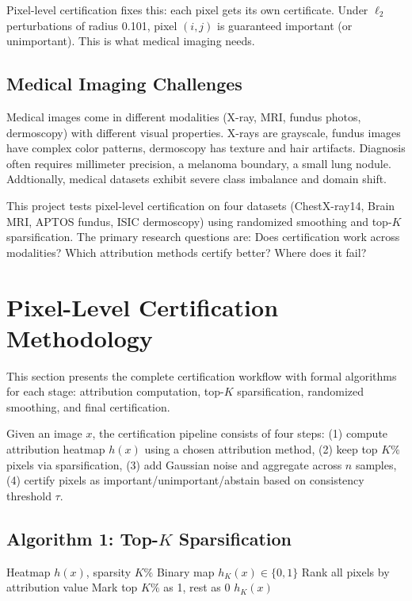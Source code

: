 \documentclass[11pt]{article}
\begin{document}
Pixel-level certification fixes this: each pixel gets its own certificate. Under $\ell_2$ perturbations of radius 0.101, pixel $(i,j)$ is guaranteed important (or unimportant). This is what medical imaging needs.

\subsection{Medical Imaging Challenges}

Medical images come in different modalities (X-ray, MRI, fundus photos, dermoscopy) with different visual properties. X-rays are grayscale, fundus images have complex color patterns, dermoscopy has texture and hair artifacts. Diagnosis often requires millimeter precision, a melanoma boundary, a small lung nodule. Addtionally, medical datasets exhibit severe class imbalance and domain shift.

This project tests pixel-level certification on four datasets (ChestX-ray14, Brain MRI, APTOS fundus, ISIC dermoscopy) using randomized smoothing and top-$K$ sparsification. The primary research questions are: Does certification work across modalities? Which attribution methods certify better? Where does it fail?

\section{Pixel-Level Certification Methodology}

This section presents the complete certification workflow with formal algorithms for each stage: attribution computation, top-$K$ sparsification, randomized smoothing, and final certification.

Given an image $x$, the certification pipeline consists of four steps: (1) compute attribution heatmap $h(x)$ using a chosen attribution method, (2) keep top $K\%$ pixels via sparsification, (3) add Gaussian noise and aggregate across $n$ samples, (4) certify pixels as important/unimportant/abstain based on consistency threshold $\tau$.

\subsection{Algorithm 1: Top-$K$ Sparsification}

\begin{algorithm}[H]
\caption{Top-$K$ Sparsification}
\label{alg:topk_sparsification}
\begin{algorithmic}[1]
\REQUIRE Heatmap $h(x)$, sparsity $K\%$
\ENSURE Binary map $h_K(x) \in \{0,1\}$
\STATE Rank all pixels by attribution value
\STATE Mark top $K\%$ as 1, rest as 0
\RETURN $h_K(x)$
\end{algorithmic}
\end{algorithm}
\end{document}
